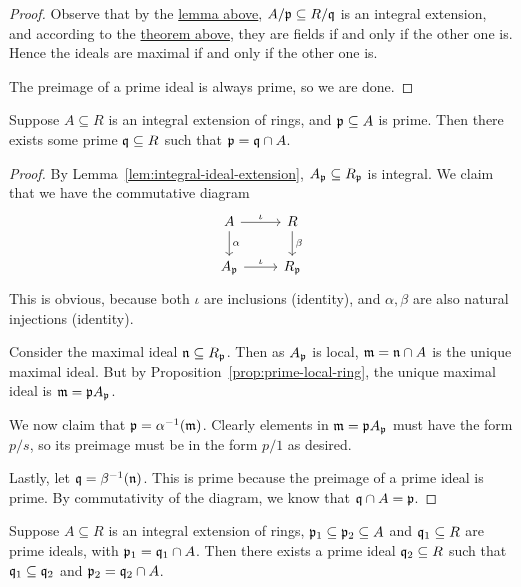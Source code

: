 \begin{proof}
    Observe that by the \hyperref[lem:integral-ideal-extension]{lemma above},
    \(A/\mathfrak{p} \subseteq R/\mathfrak{q}\) is an integral extension,
    and according to the \hyperref[thm:integral-field-extension]{theorem above},
    they are fields if and only if the other one is.
    Hence the ideals are maximal if and only if the other one is.

    The preimage of a prime ideal is always prime, so we are done.
\end{proof}
\begin{theorem}\label{thm:integral-prime-ideal}
    Suppose \(A \subseteq R\) is an integral extension of rings,
    and \(\mathfrak{p} \subseteq A\) is prime.
    Then there exists some prime \(\mathfrak{q} \subseteq R\)
    such that \(\mathfrak{p} = \mathfrak{q} \cap A\).
\end{theorem}
\begin{proof}
    By Lemma~\ref{lem:integral-ideal-extension},
    \(A_{\mathfrak{p}} \subseteq R_{\mathfrak{p}}\) is integral.
    We claim that we have the commutative diagram
    \begin{equation*}
        \begin{tikzcd}
            A \arrow{r}{\iota} \arrow{d}{\alpha} & R \arrow{d}{\beta} \\
            A_\mfk{p} \arrow{r}{\iota} & R_\mfk{p}
        \end{tikzcd}
    \end{equation*}
    This is obvious, because both \(\iota\) are inclusions (identity),
    and \(\alpha,\beta\) are also natural injections (identity).

    Consider the maximal ideal \(\mathfrak{n} \subseteq R_{\mathfrak{p}}\).
    Then as \(A_{\mathfrak{p}}\) is local, \(\mathfrak{m} = \mathfrak{n} \cap A\) is the unique maximal ideal.
    But by Proposition~\ref{prop:prime-local-ring},
    the unique maximal ideal is \(\mathfrak{m} = \mathfrak{p}A_{\mathfrak{p}}\).

    We now claim that \(\mathfrak{p} = \alpha^{-1}(\mathfrak{m})\).
    Clearly elements in \(\mathfrak{m} = \mathfrak{p}A_{\mathfrak{p}}\) must have the form \(p/s\),
    so its preimage must be in the form \(p/1\) as desired.

    Lastly, let \(\mathfrak{q} = \beta^{-1}(\mathfrak{n})\).
    This is prime because the preimage of a prime ideal is prime.
    By commutativity of the diagram, we know that \(\mathfrak{q} \cap A = \mathfrak{p}\).
\end{proof}
\begin{theorem}
    Suppose \(A \subseteq R\) is an integral extension of rings,
    \(\mathfrak{p}_1 \subseteq \mathfrak{p}_2 \subseteq A\) and \(\mathfrak{q}_1 \subseteq R\) are prime ideals,
    with \(\mathfrak{p}_1 = \mathfrak{q}_1 \cap A\).
    Then there exists a prime ideal \(\mathfrak{q}_2 \subseteq R\)
    such that \(\mathfrak{q}_1 \subseteq \mathfrak{q}_2\) and \(\mathfrak{p}_2 = \mathfrak{q}_2 \cap A\).
\end{theorem}
